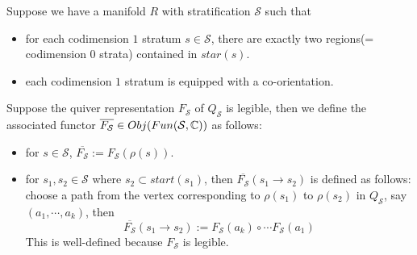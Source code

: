 \begin{definition}
Suppose we have a manifold $R$ with stratification $\mathcal{S}$ such that
\begin{itemize}
\item for each codimension $1$ stratum $s\in \mathcal{S}$, there are exactly two regions(= codimension $0$ strata) contained in $star(s)$.

\item each codimension $1$ stratum is equipped with a co-orientation.
\end{itemize}
Suppose the quiver representation $F_\mathcal{S}$ of $Q_\mathcal{S}$ is legible, then we define the associated functor $\overline{F_\mathcal{S}}\in Obj(Fun(\mathcal{S}, \mathbb{C}))$ as follows:
\begin{itemize}
\item for $s\in \mathcal{S}$, $\overline{F_\mathcal{S}} := F_\mathcal{S}(\rho(s))$.

\item for $s_1,s_2 \in \mathcal{S}$ where $s_2 \subset start(s_1)$, then $\overline{F_\mathcal{S}}(s_1 \rightarrow s_2)$ is defined as follows: choose a path from the vertex corresponding to $\rho(s_1)$ to $\rho(s_2)$ in $Q_\mathcal{S}$, say $(a_1,\cdots,a_k)$, then 
\[
\overline{F_\mathcal{S}}(s_1 \rightarrow s_2) := F_\mathcal{S}(a_k)\circ\cdots F_\mathcal{S}(a_1)
\] 
This is well-defined because $F_\mathcal{S}$ is legible.
\end{itemize}
\end{definition}

